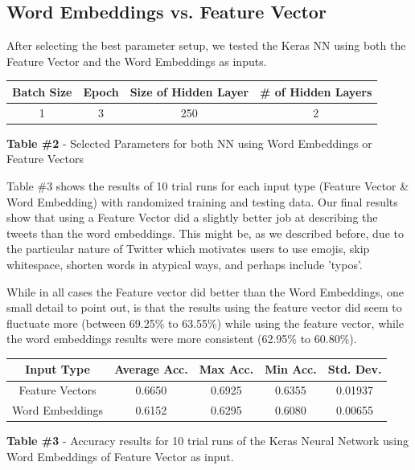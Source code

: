 \documentclass[11pt,onecolumn]{article} %
\begin{document}
\subsection{Word Embeddings vs. Feature Vector}
After selecting the best parameter setup, we tested the Keras NN using both the Feature Vector and the Word Embeddings as inputs. 

\begin{center}
	\begin{tabular}{ | c | c | c | c |}
		\hline
		Batch Size & Epoch & Size of Hidden Layer & \# of Hidden Layers \\
		\hline
		1 & 3 &  250 & 2 \\
		\hline
	\end{tabular}
	\newline
	\newline
	\textbf{Table \#2 } - Selected Parameters for both NN using Word Embeddings or Feature Vectors
\end{center}

\par Table \#3 shows the results of 10 trial runs for each input type (Feature Vector \& Word Embedding) with randomized training and testing data. Our final results show that using a Feature Vector did a slightly better job at describing the tweets than the word embeddings. This might be, as we described before, due to the particular nature of Twitter which motivates users to use emojis, skip whitespace, shorten words in atypical ways, and perhaps include 'typos'. 
\par While in all cases the Feature vector did better than the Word Embeddings, one small detail to point out, is that the results using the feature vector did seem to fluctuate more (between 69.25\% to 63.55\%) while using the feature vector, while the word embeddings results were more consistent (62.95\% to 60.80\%).

\begin{center}
	\begin{tabular}{ | c | c | c | c | c |}
		\hline
		Input Type & Average Acc. & Max Acc. & Min Acc. & Std. Dev. \\
		\hline
		Feature Vectors & 0.6650 & 0.6925 & 0.6355 & 0.01937 \\
		\hline
		Word Embeddings & 0.6152 &	0.6295 &	0.6080 & 0.00655
		\\
		\hline
	\end{tabular}
	\newline
	\newline
	\textbf{Table \#3} - Accuracy results for 10 trial runs of the Keras Neural Network using Word Embeddings of Feature Vector as input.
\end{center}
\end{document}
